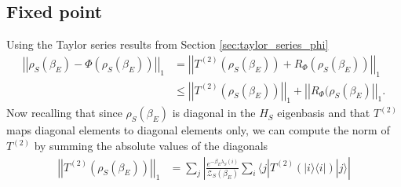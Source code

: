 \documentclass{article}
\newcommand{\ket}[1]{|#1\rangle}
\newcommand{\bra}[1]{\langle #1|}
\newcommand{\ketbra}[2]{| #1\rangle\! \langle #2|}
\newcommand{\norm}[1]{\left| \left| #1 \right| \right|}
\newcommand{\partfun}{\mathcal{Z}}
\begin{document}
\subsection{Fixed point}
Using the Taylor series results from Section \ref{sec:taylor_series_phi}
\begin{align}
    \norm{\rho_S(\beta_E) - \Phi(\rho_S(\beta_E))}_1 &= \norm{T^{(2)}(\rho_S(\beta_E)) + R_{\Phi}(\rho_S(\beta_E))}_1 \\
    &\leq \norm{T^{(2)}(\rho_S(\beta_E))}_1 + \norm{R_{\Phi}(\rho_S(\beta_E)}_1 .
\end{align}
Now recalling that since $\rho_S(\beta_E)$ is diagonal in the $H_S$ eigenbasis and that $T^{(2)}$ maps diagonal elements to diagonal elements only, we can compute the norm of $T^{(2)}$ by summing the absolute values of the diagonals
\begin{align}
    \norm{T^{(2)}(\rho_S(\beta_E))}_1 &= \sum_j \left| \frac{e^{-\beta_E \lambda_S(i)}}{\partfun_S(\beta_E)} \sum_i \bra{j} T^{(2)}(\ketbra{i}{i}) \ket{j} \right|
\end{align}
\end{document}

